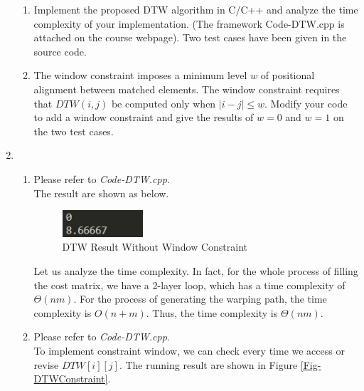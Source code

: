 \documentclass[12pt,a4paper]{article}
\makeatletter
\newtheorem*{solution}{Solution}
\theoremstyle{definition}
\renewenvironment{solution}[1][Solution] {\par\pushQED{\qed}\normalfont\topsep6\p@\@plus6\p@\relax\trivlist\item[\hskip\labelsep\bfseries#1\@addpunct{.}]\ignorespaces}{\popQED\endtrivlist\@endpefalse} \makeatother
\makeatother
\begin{document}
\begin{enumerate}
		\begin{enumerate}
			\item Implement the proposed DTW algorithm in C/C++ and analyze the time complexity of your implementation. ({\color{blue}The framework Code-DTW.cpp is attached on the course webpage}). Two test cases have been given in the source code. 
			\item The window constraint imposes a minimum level $w$ of positional alignment between matched elements. The window constraint requires that $DTW(i, j)$ be computed only when $|i-j| \leq w$. Modify your code to add a window constraint and give the results of $ w=0 $ and $ w=1 $ on the two test cases. 
		\end{enumerate}
		\begin{solution}
		~
		\begin{enumerate}
		    \item Please refer to \emph{Code-DTW.cpp}.\\
		    The result are shown as below.
		    \begin{figure}[htbp]
                \centering \includegraphics[width=0.3\textwidth]{Fig-DTWResult.png}
                \caption{DTW Result Without Window Constraint}\label{Fig-DTW}
            \end{figure}

		    Let us analyze the time complexity. In fact, for the whole process of filling the cost matrix, we have a 2-layer loop, which has a time complexity of $\Theta(nm)$. For the process of generating the warping path, the time complexity is $O(n+m)$. Thus, the time complexity is $\Theta(nm)$.
		    \item Please refer to \emph{Code-DTW.cpp}.\\
		    To implement constraint window, we can check every time we access or revise $DTW[i][j]$. The running result are shown in Figure \ref{Fig-DTWConstraint}.
		    

\end{enumerate}
\end{solution}
\end{enumerate}
\end{document}
